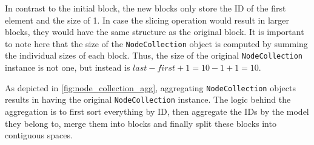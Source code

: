 In contrast to the initial block, the new blocks only store the ID of the first element and the size of 1. In case the slicing operation would result in larger blocks, they would have the same structure as the original block. It is important to note here that the size of the \texttt{NodeCollection} object is computed by summing the individual sizes of each block. Thus, the size of the original \texttt{NodeCollection} instance is not one, but instead is $last - first + 1 = 10 - 1 + 1 = 10$.

As depicted in \autoref{fig:node_collection_agg}, aggregating \texttt{NodeCollection} objects results in having the original \texttt{NodeCollection} instance. The logic behind the aggregation is to first sort everything by ID, then aggregate the IDs by the model they belong to, merge them into blocks and finally split these blocks into contiguous spaces.

